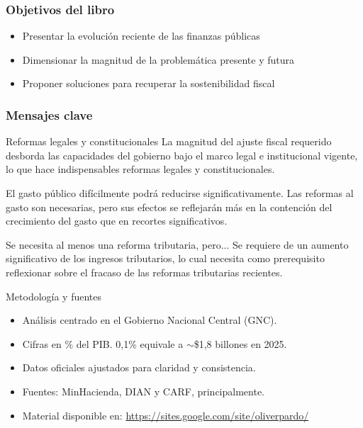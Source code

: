 \begin{frame}
    \frametitle{Objetivos del libro}  
    \begin{itemize}
        \item Presentar la evolución reciente de las finanzas públicas
        \item Dimensionar la magnitud de la problemática presente y futura 
        \item Proponer soluciones para recuperar la sostenibilidad fiscal
    \end{itemize}
\end{frame}

\begin{frame}
    \frametitle{Mensajes clave}  
\begin{block}{Reformas legales y constitucionales}
La magnitud del ajuste fiscal requerido desborda las capacidades del gobierno bajo el marco legal e institucional vigente, lo que hace indispensables reformas legales y constitucionales.
\end{block}
\begin{block}{El gasto público difícilmente podrá reducirse significativamente.}
Las reformas al gasto son necesarias, pero sus efectos se reflejarán más en la contención del crecimiento del gasto que en recortes significativos.
\end{block}
\begin{block}{Se necesita al menos una reforma tributaria, pero...}
Se requiere de un aumento significativo de los ingresos tributarios, lo cual necesita como prerequisito reflexionar sobre el fracaso de las reformas tributarias recientes.
\end{block}
\end{frame}

\begin{frame}{Metodología y fuentes}
\begin{itemize}
    \item Análisis centrado en el Gobierno Nacional Central (GNC).
    \item Cifras en \% del PIB. 0,1\% equivale a $\sim$\$1,8 billones en 2025.
    \item Datos oficiales ajustados para claridad y consistencia.
    \item Fuentes: MinHacienda, DIAN y CARF, principalmente.
    \item Material disponible en: \url{https://sites.google.com/site/oliverpardo/}
\end{itemize}
\end{frame}
